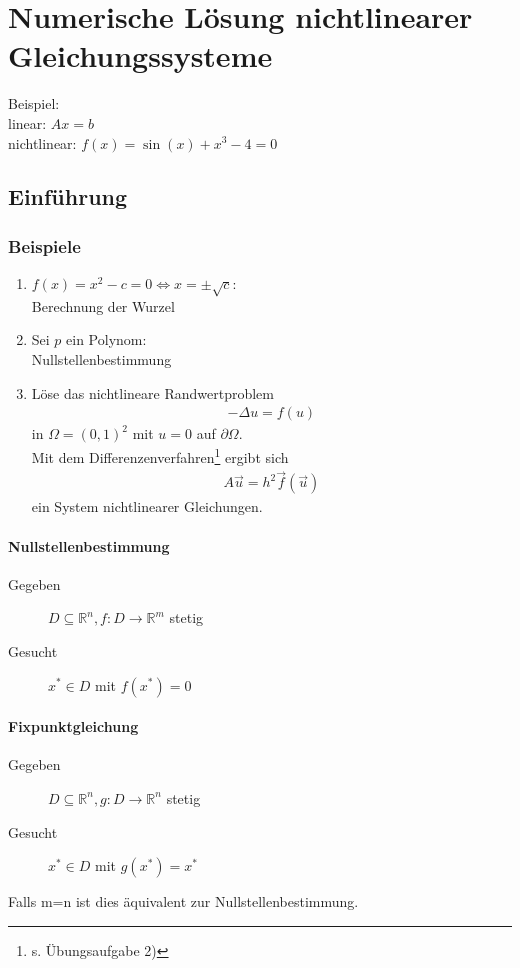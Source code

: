 \documentclass[ngerman,fontsize=11pt, paper=a4, parskip=half, titlepage=true, toc=bib]{scrbook}
\newcommand{\R}{\mathds{R}}
\newcommand{\sectione}[1]{\section{#1} \setcounter{equation}{0}}
\begin{document}
  
  \chapter{Numerische Lösung nichtlinearer Gleichungssysteme}
  Beispiel:\\
  linear: $Ax=b$ \\
  nichtlinear: $f(x) = \sin(x) +x^3-4=0$
  
  \sectione{Einführung}
  \subsection{Beispiele}
  \begin{enumerate}[1)]
  \item $f(x) = x^2-c = 0 \Leftrightarrow x= \pm \sqrt{c}$: \\Berechnung der Wurzel
  \item Sei $p$ ein Polynom:\\ Nullstellenbestimmung
  \item Löse das nichtlineare Randwertproblem
    \begin{gather*}
      -\Delta u = f(u)
    \end{gather*}
    in $\Omega=(0,1)^2$ mit $u=0$ auf $\partial \Omega$. \\
    Mit dem Differenzenverfahren\footnote{s. Übungsaufgabe 2)}
    ergibt sich
    \begin{gather*}
      A\vec{u} = h^2 \vec{f}(\vec{u})
    \end{gather*}
    ein System nichtlinearer Gleichungen.
  \end{enumerate}
  
  \subsubsection{Nullstellenbestimmung}
  \begin{description}
  \item[Gegeben]   $D\subseteq \R^n, f: D\rightarrow \R^m$ stetig
  \item[Gesucht]    $x^{*}\in D $ mit $f(x^{*}) = 0$
  \end{description}
  
  \subsubsection{Fixpunktgleichung}
  \begin{description}
  \item[Gegeben]   $D\subseteq \R^n, g: D\rightarrow \R^n$ stetig
  \item[Gesucht]      $x^{*}\in D $ mit $g(x^{*}) = x^{*}$
  \end{description}
  Falls m=n ist dies äquivalent zur Nullstellenbestimmung.
  
\end{document}
